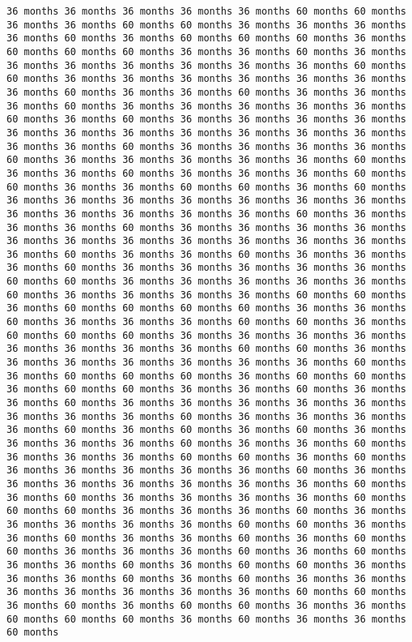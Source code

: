 \documentclass[11pt]{article}
\begin{document}
\begin{Verbatim}[commandchars=\\\{\}, frame=single, framerule=2mm, rulecolor=\color{outerrorbackground}]
36 months 36 months 36 months 36 months 36 months 60 months 60 months 36 months 36 months 60 months 60 months 36 months 36 months 36 months 36 months 60 months 36 months 60 months 60 months 60 months 36 months 60 months 60 months 60 months 36 months 36 months 60 months 36 months 36 months 36 months 36 months 36 months 36 months 36 months 60 months 60 months 36 months 36 months 36 months 36 months 36 months 36 months 36 months 60 months 36 months 36 months 60 months 36 months 36 months 36 months 60 months 36 months 36 months 36 months 36 months 36 months 60 months 36 months 60 months 36 months 36 months 36 months 36 months 36 months 36 months 36 months 36 months 36 months 36 months 36 months 36 months 36 months 60 months 36 months 36 months 36 months 36 months 60 months 36 months 36 months 36 months 36 months 36 months 60 months 36 months 36 months 60 months 36 months 36 months 36 months 60 months 60 months 36 months 36 months 60 months 60 months 36 months 60 months 36 months 36 months 36 months 36 months 36 months 36 months 36 months 36 months 36 months 36 months 36 months 36 months 60 months 36 months 36 months 36 months 60 months 36 months 36 months 36 months 36 months 36 months 36 months 36 months 36 months 36 months 36 months 36 months 36 months 60 months 36 months 36 months 60 months 36 months 36 months 36 months 60 months 36 months 36 months 36 months 36 months 36 months 60 months 60 months 36 months 36 months 36 months 36 months 36 months 60 months 36 months 36 months 36 months 36 months 60 months 60 months 36 months 60 months 60 months 60 months 60 months 36 months 36 months 60 months 36 months 36 months 36 months 60 months 60 months 36 months 60 months 60 months 60 months 36 months 36 months 36 months 36 months 36 months 36 months 36 months 36 months 60 months 60 months 36 months 36 months 36 months 36 months 36 months 36 months 36 months 60 months 36 months 60 months 60 months 60 months 36 months 60 months 60 months 36 months 60 months 60 months 36 months 36 months 60 months 36 months 36 months 60 months 36 months 36 months 36 months 36 months 36 months 36 months 36 months 36 months 60 months 36 months 36 months 36 months 36 months 60 months 36 months 60 months 36 months 60 months 36 months 36 months 36 months 36 months 60 months 36 months 36 months 60 months 36 months 36 months 36 months 60 months 60 months 36 months 60 months 36 months 36 months 36 months 36 months 36 months 60 months 36 months 36 months 36 months 36 months 36 months 36 months 36 months 60 months 36 months 60 months 36 months 36 months 36 months 36 months 60 months 60 months 60 months 36 months 36 months 36 months 60 months 36 months 36 months 36 months 36 months 36 months 60 months 60 months 36 months 36 months 60 months 36 months 36 months 60 months 36 months 60 months 60 months 36 months 36 months 36 months 60 months 36 months 60 months 36 months 36 months 60 months 36 months 60 months 60 months 36 months 36 months 36 months 60 months 36 months 60 months 36 months 36 months 36 months 36 months 36 months 36 months 36 months 60 months 60 months 36 months 60 months 36 months 60 months 60 months 36 months 36 months 60 months 60 months 60 months 36 months 60 months 36 months 36 months 60 months 
\end{Verbatim}
\end{document}
